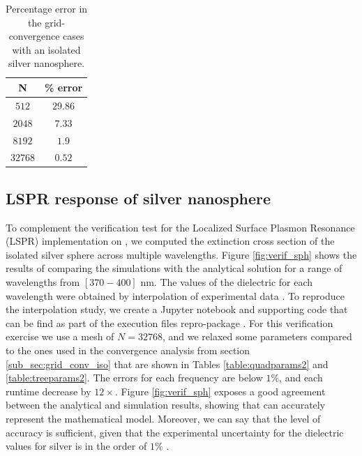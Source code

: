  
 \begin{table}%
     \centering
     \caption{\label{table:err_iso_sph} Percentage error in the grid-convergence cases with an 
     isolated silver nanosphere.} 
     \begin{tabular}{c c}
     \hline%
     N & \% error \\
     \hline%
      $512$ & $29.86$ \\
      $2048$ & $7.33$ \\
      $8192$ & $1.9$ \\
      $32768$ & $0.52$ \\
     \hline%
     \end{tabular}
 \end{table}


\subsection{LSPR response of silver nanosphere}\label{sub_sec:lspr_silver_np}

To complement the verification test for the Localized Surface Plasmon Resonance (LSPR) implementation
on \pygbe, we computed the extinction cross section of the isolated silver sphere across multiple 
wavelengths. Figure \ref{fig:verif_sph} shows the results of comparing the simulations with the
analytical solution for a range of wavelengths from $[370-400]$ nm. The values of the dielectric 
for each wavelength were obtained by interpolation of experimental data 
\cite{HaleQuerry1972, JohnsonChristy1972}. To reproduce the interpolation study, we create
a Jupyter notebook and supporting code that can be find as part of the execution files
repro-package \cite{ClementiETal2018b}.
For this verification exercise we use a mesh of $N=32768$, and we relaxed some parameters 
compared to the ones used in the convergence analysis from section \ref{sub_sec:grid_conv_iso} 
that are shown in Tables \ref{table:quadparams2} and \ref{table:treeparams2}. The errors for each 
frequency are below $1\%$, and each runtime decrease by $12\times$.
Figure \ref{fig:verif_sph} exposes a good agreement between the analytical and simulation results, 
showing that \pygbe can accurately represent the mathematical model. Moreover, we can say that 
the level of accuracy is sufficient, given that the experimental uncertainty for the dielectric 
values for silver is in the order of $1\%$ \cite{JohnsonChristy1972}. 

